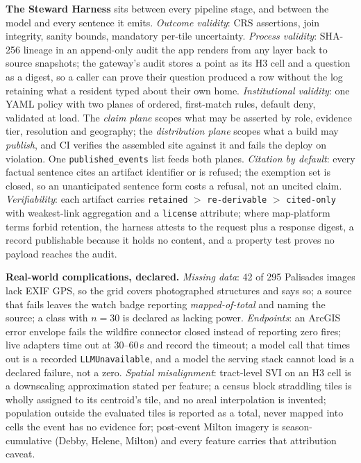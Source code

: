 \documentclass[sigconf,screen]{acmart}
\begin{document}
\textbf{The Steward Harness} sits between every pipeline stage, and
between the model and every sentence it emits. \emph{Outcome validity}:
CRS assertions, join integrity, sanity bounds, mandatory per-tile
uncertainty. \emph{Process validity}: SHA-256 lineage in an append-only
audit the app renders from any layer back to source snapshots; the
gateway's audit stores a point as its H3 cell and a question as a digest,
so a caller can prove their question produced a row without the log
retaining what a resident typed about their own home. \emph{Institutional
validity}: one YAML policy with two planes of ordered, first-match rules,
default deny, validated at load. The \emph{claim plane} scopes what may be
asserted by role, evidence tier, resolution and geography; the
\emph{distribution plane} scopes what a build may \emph{publish}, and CI
verifies the assembled site against it and fails the deploy on violation.
One \texttt{published\_events} list feeds both planes. \emph{Citation by
default}: every factual sentence cites an artifact identifier or is
refused; the exemption set is closed, so an unanticipated sentence form
costs a refusal, not an uncited claim. \emph{Verifiability}: each artifact
carries \texttt{retained} $>$ \texttt{re-derivable} $>$
\texttt{cited-only} with weakest-link aggregation and a \texttt{license}
attribute; where map-platform terms forbid retention, the harness attests
to the request plus a response digest, a record publishable because it
holds no content, and a property test proves no payload reaches the audit.

\textbf{Real-world complications, declared.} \emph{Missing data}: 42 of
295 Palisades images lack EXIF GPS, so the grid covers photographed
structures and says so; a source that fails leaves the watch badge
reporting \emph{mapped-of-total} and naming the source; a class with
$n{=}30$ is declared as lacking power. \emph{Endpoints}: an ArcGIS error
envelope fails the wildfire connector closed instead of reporting zero
fires; live adapters time out at 30--60\,s and record the timeout; a
model call that times out is a recorded \texttt{LLMUnavailable}, and a
model the serving stack cannot load is a declared failure, not a zero.
\emph{Spatial misalignment}: tract-level SVI on an H3 cell is a downscaling
approximation stated per feature; a census block straddling tiles is
wholly assigned to its centroid's tile, and no areal interpolation is
invented; population outside the evaluated tiles is reported as a total,
never mapped into cells the event has no evidence for; post-event Milton
imagery is season-cumulative (Debby, Helene, Milton) and every feature
carries that attribution caveat.
\end{document}
